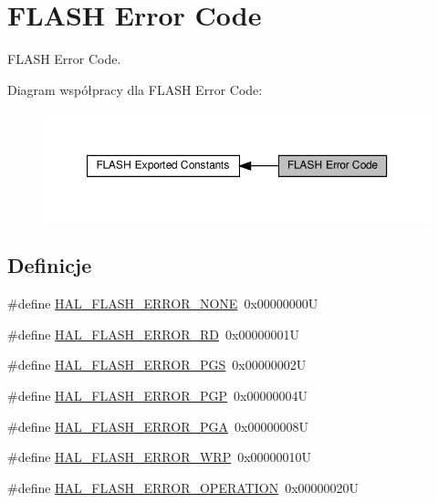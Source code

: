 \hypertarget{group___f_l_a_s_h___error___code}{}\section{F\+L\+A\+SH Error Code}
\label{group___f_l_a_s_h___error___code}


F\+L\+A\+SH Error Code.  


Diagram współpracy dla F\+L\+A\+SH Error Code\+:\nopagebreak
\begin{figure}[H]
\begin{center}
\leavevmode
\includegraphics[width=350pt]{group___f_l_a_s_h___error___code}
\end{center}
\end{figure}
\subsection*{Definicje}
\begin{DoxyCompactItemize}
\item 
\#define \hyperlink{group___f_l_a_s_h___error___code_gae7fb9ee7198d393aba27ade3a9f50a70}{H\+A\+L\+\_\+\+F\+L\+A\+S\+H\+\_\+\+E\+R\+R\+O\+R\+\_\+\+N\+O\+NE}~0x00000000U
\item 
\#define \hyperlink{group___f_l_a_s_h___error___code_ga33008f2ad5085cd4158dd260fb2d124d}{H\+A\+L\+\_\+\+F\+L\+A\+S\+H\+\_\+\+E\+R\+R\+O\+R\+\_\+\+RD}~0x00000001U
\item 
\#define \hyperlink{group___f_l_a_s_h___error___code_ga7132ff3b7f45c0cfe818d61bdb01dc64}{H\+A\+L\+\_\+\+F\+L\+A\+S\+H\+\_\+\+E\+R\+R\+O\+R\+\_\+\+P\+GS}~0x00000002U
\item 
\#define \hyperlink{group___f_l_a_s_h___error___code_ga4c79d30899d81069a5a7d36c9a008114}{H\+A\+L\+\_\+\+F\+L\+A\+S\+H\+\_\+\+E\+R\+R\+O\+R\+\_\+\+P\+GP}~0x00000004U
\item 
\#define \hyperlink{group___f_l_a_s_h___error___code_gad9f62b6567543610f667bce580550662}{H\+A\+L\+\_\+\+F\+L\+A\+S\+H\+\_\+\+E\+R\+R\+O\+R\+\_\+\+P\+GA}~0x00000008U
\item 
\#define \hyperlink{group___f_l_a_s_h___error___code_ga27e871d85f9311272098315bc3723075}{H\+A\+L\+\_\+\+F\+L\+A\+S\+H\+\_\+\+E\+R\+R\+O\+R\+\_\+\+W\+RP}~0x00000010U
\item 
\#define \hyperlink{group___f_l_a_s_h___error___code_gafa1433e0ca2366478928c04244310d44}{H\+A\+L\+\_\+\+F\+L\+A\+S\+H\+\_\+\+E\+R\+R\+O\+R\+\_\+\+O\+P\+E\+R\+A\+T\+I\+ON}~0x00000020U
\end{DoxyCompactItemize}



